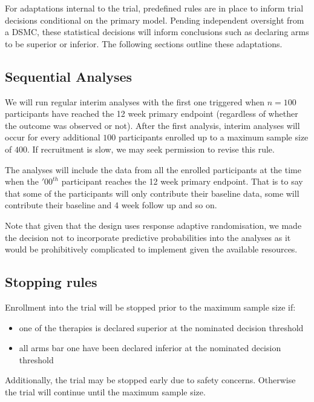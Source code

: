 \documentclass[
]{article}
\begin{document}
For adaptations internal to the trial, predefined rules are in place to inform trial decisions conditional on the primary model.
Pending independent oversight from a DSMC, these statistical decisions will inform conclusions such as declaring arms to be superior or inferior.
The following sections outline these adaptations.

\hypertarget{sequential-analyses}{%
\subsection{Sequential Analyses}\label{sequential-analyses}}

We will run regular interim analyses with the first one triggered when \(n=100\) participants have reached the 12 week primary endpoint (regardless of whether the outcome was observed or not).
After the first analysis, interim analyses will occur for every additional \(100\) participants enrolled up to a maximum sample size of \(400\).
If recruitment is slow, we may seek permission to revise this rule.

The analyses will include the data from all the enrolled participants at the time when the $'00^{th}$ participant reaches the 12 week primary endpoint.
That is to say that some of the participants will only contribute their baseline data, some will contribute their baseline and 4 week follow up and so on.

Note that given that the design uses response adaptive randomisation, we made the decision not to incorporate predictive probabilities into the analyses as it would be prohibitively complicated to implement given the available resources.

\hypertarget{stopping-rules}{%
\subsection{Stopping rules}\label{stopping-rules}}

Enrollment into the trial will be stopped prior to the maximum sample size if:

\begin{itemize}
\item one of the therapies is declared superior at the nominated decision threshold
\item all arms bar one have been declared inferior at the nominated decision threshold
\end{itemize}

Additionally, the trial may be stopped early due to safety concerns.
Otherwise the trial will continue until the maximum sample size.
\end{document}
